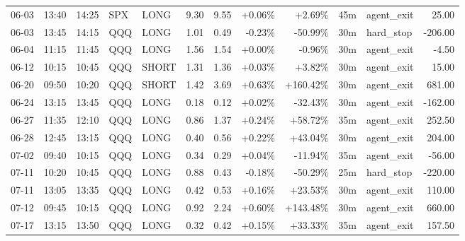\documentclass[11pt,a4paper,twoside]{article}
\begin{document}
\begin{center}
\begin{longtable}{>{\color{txtmain}}l l l l l r r r r r >{\color{txtmain}}l r}
06-03 & 13:40 & 14:25 & SPX & LONG & 9.30 & 9.55 & \textcolor{wingreen}{+0.06\%} & \textcolor{wingreen}{+2.69\%} & 45m & agent\_exit & \textcolor{wingreen}{25.00} \\
06-03 & 13:45 & 14:15 & QQQ & LONG & 1.01 & 0.49 & \textcolor{lossred}{-0.23\%} & \textcolor{lossred}{-50.99\%} & 30m & hard\_stop & \textcolor{lossred}{-206.00} \\
06-04 & 11:15 & 11:45 & QQQ & LONG & 1.56 & 1.54 & \textcolor{wingreen}{+0.00\%} & \textcolor{lossred}{-0.96\%} & 30m & agent\_exit & \textcolor{lossred}{-4.50} \\
06-12 & 10:15 & 10:45 & QQQ & SHORT & 1.31 & 1.36 & \textcolor{wingreen}{+0.03\%} & \textcolor{wingreen}{+3.82\%} & 30m & agent\_exit & \textcolor{wingreen}{15.00} \\
06-20 & 09:50 & 10:20 & QQQ & SHORT & 1.42 & 3.69 & \textcolor{wingreen}{+0.63\%} & \textcolor{wingreen}{+160.42\%} & 30m & agent\_exit & \textcolor{wingreen}{681.00} \\
06-24 & 13:15 & 13:45 & QQQ & LONG & 0.18 & 0.12 & \textcolor{wingreen}{+0.02\%} & \textcolor{lossred}{-32.43\%} & 30m & agent\_exit & \textcolor{lossred}{-162.00} \\
06-27 & 11:35 & 12:10 & QQQ & LONG & 0.86 & 1.37 & \textcolor{wingreen}{+0.24\%} & \textcolor{wingreen}{+58.72\%} & 35m & agent\_exit & \textcolor{wingreen}{252.50} \\
06-28 & 12:45 & 13:15 & QQQ & LONG & 0.40 & 0.56 & \textcolor{wingreen}{+0.22\%} & \textcolor{wingreen}{+43.04\%} & 30m & agent\_exit & \textcolor{wingreen}{204.00} \\
07-02 & 09:40 & 10:15 & QQQ & LONG & 0.34 & 0.29 & \textcolor{wingreen}{+0.04\%} & \textcolor{lossred}{-11.94\%} & 35m & agent\_exit & \textcolor{lossred}{-56.00} \\
07-11 & 10:20 & 10:45 & QQQ & LONG & 0.88 & 0.43 & \textcolor{lossred}{-0.18\%} & \textcolor{lossred}{-50.29\%} & 25m & hard\_stop & \textcolor{lossred}{-220.00} \\
07-11 & 13:05 & 13:35 & QQQ & LONG & 0.42 & 0.53 & \textcolor{wingreen}{+0.16\%} & \textcolor{wingreen}{+23.53\%} & 30m & agent\_exit & \textcolor{wingreen}{110.00} \\
07-12 & 09:45 & 10:15 & QQQ & LONG & 0.92 & 2.24 & \textcolor{wingreen}{+0.60\%} & \textcolor{wingreen}{+143.48\%} & 30m & agent\_exit & \textcolor{wingreen}{660.00} \\
07-17 & 13:15 & 13:50 & QQQ & LONG & 0.32 & 0.42 & \textcolor{wingreen}{+0.15\%} & \textcolor{wingreen}{+33.33\%} & 35m & agent\_exit & \textcolor{wingreen}{157.50} \\

\end{longtable}
\end{center}
\end{document}
